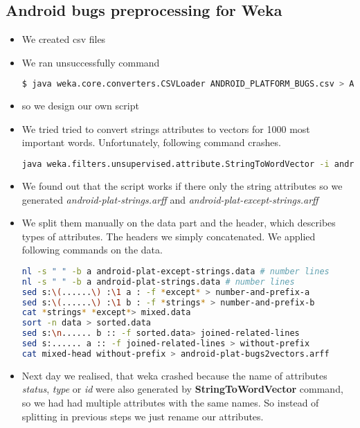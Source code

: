 \subsection{Android bugs preprocessing for Weka} %
\label{sub:Android bugs preprocessing for Weka}
\begin{itemize}
    \item We created csv files
    \item We ran unsuccessfully command
\begin{lstlisting}[language=sh]
$ java weka.core.converters.CSVLoader ANDROID_PLATFORM_BUGS.csv > ANDROID_PLATFORM_BUGS.arff
\end{lstlisting}
    \item so we design our own script
    \item  We tried tried to convert strings attributes to vectors for 1000 most important words. Unfortunately, following command crashes.
\begin{lstlisting}[language=sh]
    java weka.filters.unsupervised.attribute.StringToWordVector -i android-platform-bugs.arff -o android_plat-bugs-Vectors.arff
\end{lstlisting}
    \item We found out that the script works if there only the string attributes so we generated
    {\it android-plat-strings.arff} and {\it android-plat-except-strings.arff}
    \item We split them manually on the data part and the header, which describes types of attributes.
    The headers we simply concatenated.  We applied following commands on the data.
\begin{lstlisting}[language=sh]
nl -s " " -b a android-plat-except-strings.data # number lines
nl -s " " -b a android-plat-strings.data # number lines
sed s:\(......\) :\1 a : -f *except* > number-and-prefix-a
sed s:\(......\) :\1 b : -f *strings* > number-and-prefix-b
cat *strings* *except*> mixed.data
sort -n data > sorted.data
sed s:\n...... b :: -f sorted.data> joined-related-lines
sed s:...... a :: -f joined-related-lines > without-prefix
cat mixed-head without-prefix > android-plat-bugs2vectors.arff
\end{lstlisting}
    \item Next day we realised, that weka crashed because the name of attributes {\it status}, {\it type} or {\it id} were also generated by {\bf StringToWordVector} command, so we had had multiple attributes with the same names. So instead of splitting in previous steps we just rename our attributes.

\end{itemize}
